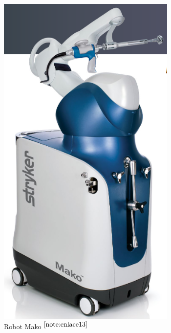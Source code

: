 \begin{figure}[ht!]
\begin{minipage}{0.15\linewidth}
		\includegraphics[width=\linewidth]{figs/mako.png}
		\caption*{\centering Robot Mako $^{\ref{note:enlace13}}$}
	\end{minipage}
    \hspace{3cm}
    \begin{minipage}{0.2\linewidth}
    	\centering

\end{minipage}
\end{figure}
